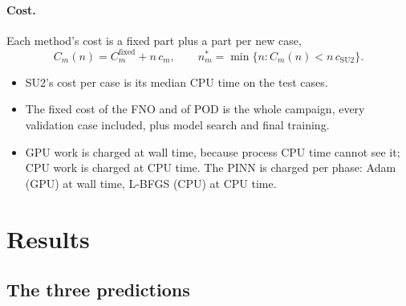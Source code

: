 \documentclass[11pt]{article}
\begin{document}
\paragraph{Cost.}
Each method's cost is a fixed part plus a part per new case,
\begin{equation}
  C_m(n) = C_m^{\mathrm{fixed}} + n\,c_m,\qquad
  n^\ast_m = \min\{n : C_m(n) < n\,c_{\mathrm{SU2}}\}.
  \label{eq:breakeven}
\end{equation}
\begin{itemize}
  \item SU2's cost per case is its median CPU time on the test cases.
  \item The fixed cost of the FNO and of POD is the whole campaign, every validation case included,
    plus model search and final training.
  \item GPU work is charged at wall time, because process CPU time cannot see it; CPU work is
    charged at CPU time. The PINN is charged per phase: Adam (GPU) at wall time, L-BFGS (CPU) at
    CPU time.
\end{itemize}

\section{Results}
\label{sec:results}

\subsection{The three predictions}
\label{sec:predictions}
\end{document}
